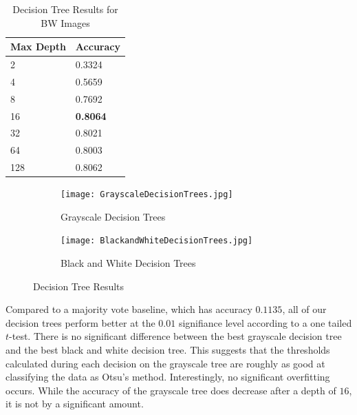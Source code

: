 \documentclass[12pt]{article}
\begin{document}
\begin{table}[ht!]
\centering
\caption{Decision Tree  Results for BW Images}
    \begin{tabular}{|l|l|}
    \hline
    Max Depth & Accuracy \\ \hline
    2      & 0.3324   \\ \hline
    4      & 0.5659   \\ \hline
    8      & 0.7692   \\ \hline
    16      & \textbf{0.8064}   \\ \hline
    32     & 0.8021   \\ \hline
	 64     & 0.8003   \\ \hline
   128    & 0.8062   \\ \hline
    \end{tabular}
\end{table}

\begin{figure}[h]
\centering
\begin{subfigure}{.45\textwidth}
  \centering
  \texttt{[image: GrayscaleDecisionTrees.jpg]}
  \caption{Grayscale Decision Trees}
  \label{fig:sub1}
\end{subfigure}%
\hspace{2mm}
\begin{subfigure}{.45\textwidth}
  \centering
  \texttt{[image: BlackandWhiteDecisionTrees.jpg]}
  \caption{Black and White Decision Trees}
  \label{fig:sub2}
\end{subfigure}
\caption{Decision Tree Results}
\label{fig:test}
\end{figure}

Compared to a majority vote baseline, which has accuracy $0.1135$, all of our decision trees perform better at the $0.01$ signifiance level according to a one tailed $t$-test. There is no significant difference between the best grayscale decision tree and the best black and white decision tree. This suggests that the thresholds calculated during each decision on the grayscale tree are roughly as good at classifying the data as Otsu's method. Interestingly, no significant overfitting occurs. While the accuracy of the grayscale tree does decrease after a depth of $16$, it is not by a significant amount.
\end{document}
